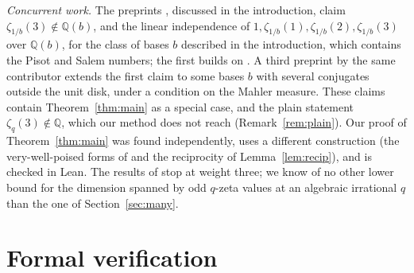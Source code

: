 \documentclass[11pt]{amsart}
\theoremstyle{definition}
\theoremstyle{remark}
\numberwithin{equation}{section}
\newcommand{\QQ}{\mathbb{Q}}
\begin{document}
\emph{Concurrent work.} The preprints \cite{Twi26,Twi26b}, discussed in the introduction, claim
$\zeta_{1/b}(3)\notin\QQ(b)$, and the linear independence of $1,\zeta_{1/b}(1),\zeta_{1/b}(2),\zeta_{1/b}(3)$ over
$\QQ(b)$, for the class of bases $b$ described in the introduction, which contains the Pisot and Salem numbers; the first
builds on \cite{UPL}. A third preprint by the same contributor \cite{Twi26c} extends the first claim to some
bases $b$ with several conjugates outside the unit disk, under a condition on the Mahler measure. These claims contain
Theorem~\ref{thm:main} as a special case, and the plain statement $\zeta_q(3)\notin\QQ$, which our method does not reach
(Remark~\ref{rem:plain}). Our proof of Theorem~\ref{thm:main} was found independently, uses a different construction
(the very-well-poised forms of \cite{KRZ06} and the reciprocity of Lemma~\ref{lem:recip}), and is checked in Lean. The
results of \cite{Twi26,Twi26b,Twi26c} stop at weight three; we know of no other lower bound for the dimension spanned by
odd $q$-zeta values at an algebraic irrational $q$ than the one of Section~\ref{sec:many}.

\section{Formal verification}\label{sec:lean}
\end{document}
